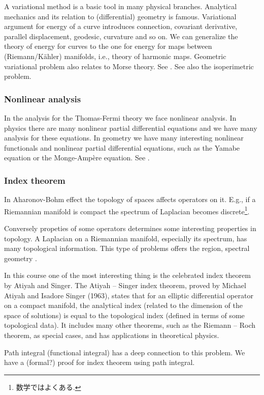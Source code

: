 \documentclass[openany, a4paper, oneside]{book}
\theoremstyle{break}
\theoremstyle{breakdefn}
\begin{document}
A variational method is a basic tool in many physical branches.
Analytical mechanics and its relation to (differential) geometry is famous.
Variational argument for energy of a curve introduces connection,
covariant derivative, parallel displacement, geodesic, curvature and so on.
We can generalize the theory of energy for curves to the one for energy for maps between (Riemann/K\"ahler) manifolds,
i.e., theory of harmonic maps.
Geometric variational problem also relates to Morse theory.
See \cite{SeikiNishikawa1}.
See also the isoperimetric problem.
\subsubsection{Nonlinear analysis}
\label{sec-7-10-1-4-3}

In the analysis for the Thomas-Fermi theory we face nonlinear analysis.
In physics there are many nonlinear partial differential equations
and we have many analysis for these equations.
In geometry we have many interesting nonlinear functionals and nonlinear partial differential equations,
such as the Yamabe equation or the Monge-Amp\`ere equation.
See \cite{ThierryAubin1}.
\subsubsection{Index theorem}
\label{sec-7-10-1-4-4}

In Aharonov-Bohm effect the topology of spaces affects operators on it.
E.g., if a Riemannian manifold is compact the spectrum of Laplacian becomes discrete\footnote{数学ではよくある.
 }.

Conversely propeties of some operators determines some interesting properties in topology.
A Laplacian on a Riemannian manifold, especially its spectrum, has many topological information.
This type of problems offers the region, spectral geometry \cite{MarkKac2}.

In this course one of the most interesting thing is the celebrated index theorem by Atiyah and Singer.
The Atiyah – Singer index theorem, proved by Michael Atiyah and Isadore Singer (1963),
states that for an elliptic differential operator on a compact manifold,
the analytical index (related to the dimension of the space of solutions) is equal to
the topological index (defined in terms of some topological data).
It includes many other theorems,
such as the Riemann – Roch theorem, as special cases, and has applications in theoretical physics.

Path integral (functional integral) has a deep connection to this problem.
We have a (formal?) proof for index theorem using path integral.
\end{document}
